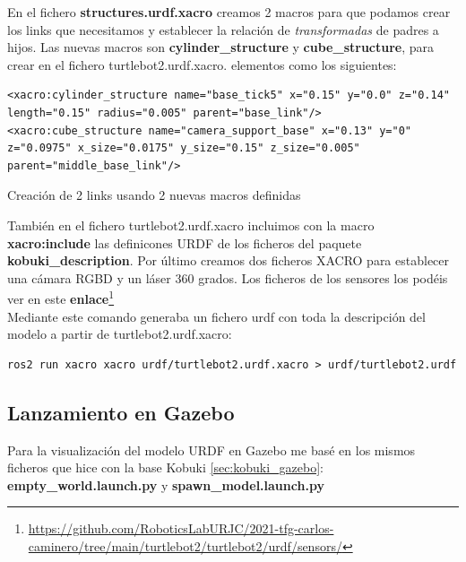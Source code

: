 En el fichero \textbf{structures.urdf.xacro} creamos 2 macros para que podamos crear los links que necesitamos y establecer la relación de \textit{transformadas} de padres a hijos. Las nuevas macros son \textbf{cylinder\_structure} y \textbf{cube\_structure}, para crear en el fichero turtlebot2.urdf.xacro. elementos como los siguientes:
\begin{code}[H]
\begin{lstlisting}
<xacro:cylinder_structure name="base_tick5" x="0.15" y="0.0" z="0.14" length="0.15" radius="0.005" parent="base_link"/>
<xacro:cube_structure name="camera_support_base" x="0.13" y="0" z="0.0975" x_size="0.0175" y_size="0.15" z_size="0.005" parent="middle_base_link"/>
\end{lstlisting}
\caption{Creación de 2 links usando 2 nuevas macros definidas}
\label{fig:creacion_link_macro}
\end{code}

También en el fichero turtlebot2.urdf.xacro incluimos con la macro \textbf{xacro:include} las definicones URDF de los ficheros del paquete \textbf{kobuki\_description}. Por último creamos dos ficheros XACRO para establecer una cámara RGBD y un láser 360 grados. Los ficheros de los sensores los podéis ver en este \textbf{enlace}\footnote{\url{https://github.com/RoboticsLabURJC/2021-tfg-carlos-caminero/tree/main/turtlebot2/turtlebot2/urdf/sensors/}}\\

Mediante este comando generaba un fichero urdf con toda la descripción del modelo a partir de turtlebot2.urdf.xacro:
\begin{lstlisting}
ros2 run xacro xacro urdf/turtlebot2.urdf.xacro > urdf/turtlebot2.urdf
\end{lstlisting}

\subsection{Lanzamiento en Gazebo}
\label{sec:turtlebot2_gazebo}

Para la visualización del modelo URDF en Gazebo me basé en los mismos ficheros que hice con la base Kobuki \ref{sec:kobuki_gazebo}: \textbf{empty\_world.launch.py} y \textbf{spawn\_model.launch.py}\\

